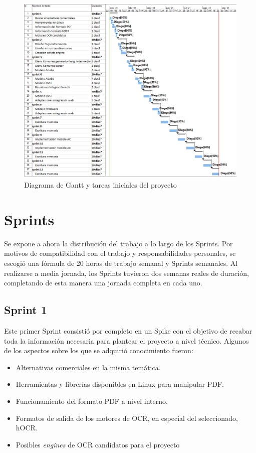\begin{figure}[hp!]
    \centering
    \includegraphics[angle=90,width=1.0\textwidth]{imaxes/f-planificacion/gantt-inicial.png}
    \caption{Diagrama de Gantt y tareas iniciales del proyecto}
    \label{fig:gantt-inicial}
\end{figure}

\section{Sprints}

Se expone a ahora la distribución del trabajo a lo largo de los Sprints. Por motivos de compatibilidad con el trabajo y responsabilidades personales, se escogió una fórmula de 20 horas de trabajo semanal y Sprints semanales. Al realizarse a media jornada, los Sprints tuvieron dos semanas reales de duración, completando de esta manera una jornada completa en cada uno.

\subsection{Sprint 1}

Este primer Sprint consistió por completo en un Spike con el objetivo de recabar toda la información necesaria para plantear el proyecto a nivel técnico. Algunos de los aspectos sobre los que se adquirió conocimiento fueron:

\begin{itemize}
    \item Alternativas comerciales en la misma temática.
    \item Herramientas y librerías disponibles en Linux para manipular PDF.
    \item Funcionamiento del formato PDF a nivel interno.
    \item Formatos de salida de los motores de OCR, en especial del seleccionado, hOCR.
    \item Posibles \emph{engines} de OCR candidatos para el proyecto
\end{itemize}

